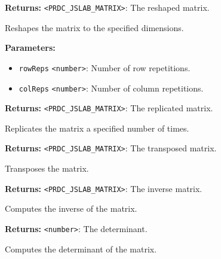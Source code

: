 \documentclass[12pt,a4paper]{article}
\begin{document}
\noindent \textbf{Returns:} \texttt{<PRDC\_JSLAB\_MATRIX>}: The reshaped matrix.

\noindent Reshapes the matrix to the specified dimensions.

\vspace{5mm}
\noindent {}


\noindent \textbf{Parameters:}
\begin{itemize}
  \item \texttt{rowReps} \texttt{<number>}: Number of row repetitions.
  \item \texttt{colReps} \texttt{<number>}: Number of column repetitions.
\end{itemize}

\noindent \textbf{Returns:} \texttt{<PRDC\_JSLAB\_MATRIX>}: The replicated matrix.

\noindent Replicates the matrix a specified number of times.

\vspace{5mm}
\noindent {}


\noindent \textbf{Returns:} \texttt{<PRDC\_JSLAB\_MATRIX>}: The transposed matrix.

\noindent Transposes the matrix.

\vspace{5mm}
\noindent {}


\noindent \textbf{Returns:} \texttt{<PRDC\_JSLAB\_MATRIX>}: The inverse matrix.

\noindent Computes the inverse of the matrix.

\vspace{5mm}
\noindent {}


\noindent \textbf{Returns:} \texttt{<number>}: The determinant.

\noindent Computes the determinant of the matrix.

\vspace{5mm}
\noindent {}
\end{document}
